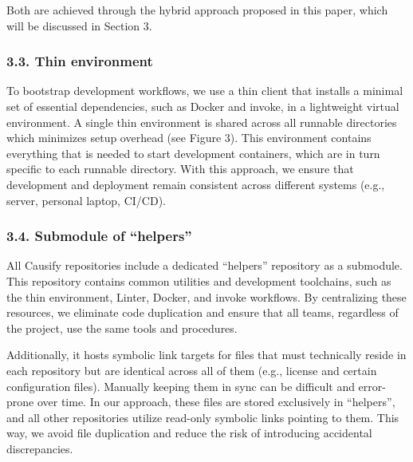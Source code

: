 \documentclass{article}
\begin{document}
Both are achieved through the hybrid approach proposed in this paper, which will
be discussed in Section 3.

\subsubsection{3.3. Thin environment}
\label{thin-environment}

To bootstrap development workflows, we use a thin client that installs a minimal
set of essential dependencies, such as Docker and invoke, in a lightweight
virtual environment. A single thin environment is shared across all runnable directories
which minimizes setup overhead (see Figure 3). This environment contains
everything that is needed to start development containers, which are in turn specific
to each runnable directory. With this approach, we ensure that development and deployment
remain consistent across different systems (e.g., server, personal laptop, CI/CD).

%
%
%

\subsubsection{3.4. Submodule of ``helpers''}
\label{submodule-of-helpers}

All Causify repositories include a dedicated ``helpers'' repository as a submodule.
This repository contains common utilities and development toolchains, such as the
thin environment, Linter, Docker, and invoke workflows. By centralizing these resources,
we eliminate code duplication and ensure that all teams, regardless of the project,
use the same tools and procedures.

Additionally, it hosts symbolic link targets for files that must technically reside
in each repository but are identical across all of them (e.g., license and
certain configuration files). Manually keeping them in sync can be difficult and
error-prone over time. In our approach, these files are stored exclusively in ``helpers'',
and all other repositories utilize read-only symbolic links pointing to them.
This way, we avoid file duplication and reduce the risk of introducing accidental
discrepancies.
\end{document}
